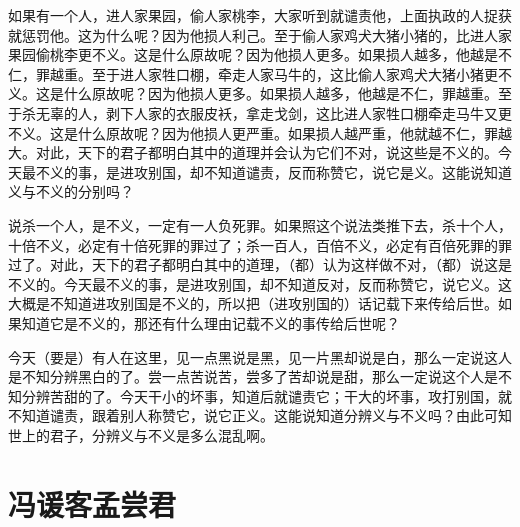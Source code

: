 \documentclass[12pt,UTF-8,openany,a4]{ctexbook}
\begin{document}
\begin{large}\yiwen
    
    如果有一个人，进人家果园，偷人家桃李，大家听到就谴责他，上面执政的人捉获就惩罚他。这为什么呢？因为他损人利己。至于偷人家鸡犬大猪小猪的，比进人家果园偷桃李更不义。这是什么原故呢？因为他损人更多。如果损人越多，他越是不仁，罪越重。至于进人家牲口棚，牵走人家马牛的，这比偷人家鸡犬大猪小猪更不义。这是什么原故呢？因为他损人更多。如果损人越多，他越是不仁，罪越重。至于杀无辜的人，剥下人家的衣服皮袄，拿走戈剑，这比进人家牲口棚牵走马牛又更不义。这是什么原故呢？因为他损人更严重。如果损人越严重，他就越不仁，罪越大。对此，天下的君子都明白其中的道理并会认为它们不对，说这些是不义的。今天最不义的事，是进攻别国，却不知道谴责，反而称赞它，说它是义。这能说知道义与不义的分别吗？
    
    说杀一个人，是不义，一定有一人负死罪。如果照这个说法类推下去，杀十个人，十倍不义，必定有十倍死罪的罪过了；杀一百人，百倍不义，必定有百倍死罪的罪过了。对此，天下的君子都明白其中的道理，（都）认为这样做不对，（都）说这是不义的。今天最不义的事，是进攻别国，却不知道反对，反而称赞它，说它义。这大概是不知道进攻别国是不义的，所以把（进攻别国的）话记载下来传给后世。如果知道它是不义的，那还有什么理由记载不义的事传给后世呢？
    
    今天（要是）有人在这里，见一点黑说是黑，见一片黑却说是白，那么一定说这人是不知分辨黑白的了。尝一点苦说苦，尝多了苦却说是甜，那么一定说这个人是不知分辨苦甜的了。今天干小的坏事，知道后就谴责它；干大的坏事，攻打别国，就不知道谴责，跟着别人称赞它，说它正义。这能说知道分辨义与不义吗？由此可知世上的君子，分辨义与不义是多么混乱啊。
    

\end{large}



\chapter{冯谖客孟尝君}
\end{document}
